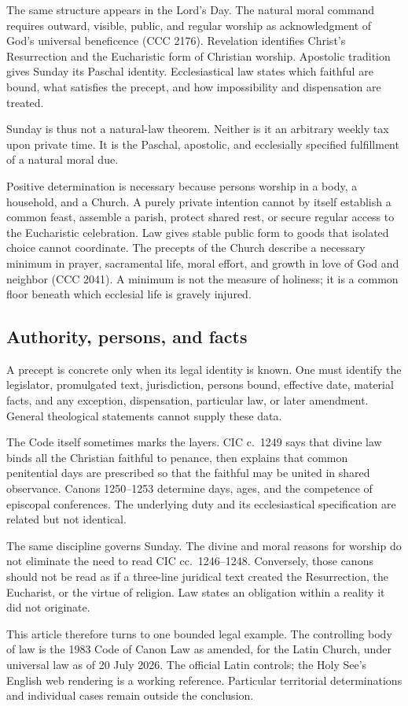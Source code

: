 The same structure appears in the Lord's Day. The natural moral command requires outward, visible, public, and regular worship as acknowledgment of God's universal beneficence (CCC 2176). Revelation identifies Christ's Resurrection and the Eucharistic form of Christian worship. Apostolic tradition gives Sunday its Paschal identity. Ecclesiastical law states which faithful are bound, what satisfies the precept, and how impossibility and dispensation are treated.

Sunday is thus not a natural-law theorem. Neither is it an arbitrary weekly tax upon private time. It is the Paschal, apostolic, and ecclesially specified fulfillment of a natural moral due.

Positive determination is necessary because persons worship in a body, a household, and a Church. A purely private intention cannot by itself establish a common feast, assemble a parish, protect shared rest, or secure regular access to the Eucharistic celebration. Law gives stable public form to goods that isolated choice cannot coordinate. The precepts of the Church describe a necessary minimum in prayer, sacramental life, moral effort, and growth in love of God and neighbor (CCC 2041). A minimum is not the measure of holiness; it is a common floor beneath which ecclesial life is gravely injured.

\subsection{Authority, persons, and facts}

A precept is concrete only when its legal identity is known. One must identify the legislator, promulgated text, jurisdiction, persons bound, effective date, material facts, and any exception, dispensation, particular law, or later amendment. General theological statements cannot supply these data.

The Code itself sometimes marks the layers. CIC c.~1249 says that divine law binds all the Christian faithful to penance, then explains that common penitential days are prescribed so that the faithful may be united in shared observance. Canons 1250--1253 determine days, ages, and the competence of episcopal conferences. The underlying duty and its ecclesiastical specification are related but not identical.

The same discipline governs Sunday. The divine and moral reasons for worship do not eliminate the need to read CIC cc.~1246--1248. Conversely, those canons should not be read as if a three-line juridical text created the Resurrection, the Eucharist, or the virtue of religion. Law states an obligation within a reality it did not originate.

This article therefore turns to one bounded legal example. The controlling body of law is the 1983 Code of Canon Law as amended, for the Latin Church, under universal law as of 20 July 2026. The official Latin controls; the Holy See's English web rendering is a working reference. Particular territorial determinations and individual cases remain outside the conclusion.
